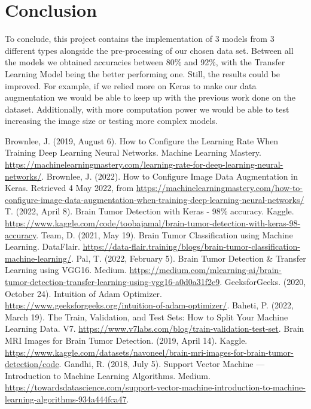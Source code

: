 \documentclass[conference]{IEEEtran}
\begin{document}
\section{Conclusion}

To conclude, this project contains the implementation of 3 models from 3 different types alongside the pre-processing of our chosen data set. Between all the models we obtained accuracies between 80\% and 92\%, with the Transfer Learning Model being the better performing one. Still, the results could be improved. For example, if we relied more on Keras to make our data augmentation we would be able to keep up with the previous work done on the dataset. Additionally, with more computation power we would be able to test increasing the image size or testing more complex models.

\begin{thebibliography}{00}
 Brownlee, J. (2019, August 6). How to Configure the Learning Rate When Training Deep Learning Neural Networks. Machine Learning Mastery. \url{https://machinelearningmastery.com/learning-rate-for-deep-learning-neural-networks/}.
 Brownlee, J. (2022). How to Configure Image Data Augmentation in Keras. Retrieved 4 May 2022, from \url{https://machinelearningmastery.com/how-to-configure-image-data-augmentation-when-training-deep-learning-neural-networks/}
 T. (2022, April 8). Brain Tumor Detection with Keras - 98\% accuracy. Kaggle. \url{https://www.kaggle.com/code/toobajamal/brain-tumor-detection-with-keras-98-accuracy}.
 Team, D. (2021, May 19). Brain Tumor Classification using Machine Learning. DataFlair. \url{https://data-flair.training/blogs/brain-tumor-classification-machine-learning/}.
 Pal, T. (2022, February 5). Brain Tumor Detection & Transfer Learning using VGG16. Medium. \url{https://medium.com/mlearning-ai/brain-tumor-detection-transfer-learning-using-vgg16-a0d0a31f2e9}.
 GeeksforGeeks. (2020, October 24). Intuition of Adam Optimizer. \url{https://www.geeksforgeeks.org/intuition-of-adam-optimizer/}.
 Baheti, P. (2022, March 19). The Train, Validation, and Test Sets: How to Split Your Machine Learning Data. V7. \url{https://www.v7labs.com/blog/train-validation-test-set}.
 Brain MRI Images for Brain Tumor Detection. (2019, April 14). Kaggle. \url{https://www.kaggle.com/datasets/navoneel/brain-mri-images-for-brain-tumor-detection/code}.
 Gandhi, R. (2018, July 5). Support Vector Machine — Introduction to Machine Learning Algorithms. Medium. \url{https://towardsdatascience.com/support-vector-machine-introduction-to-machine-learning-algorithms-934a444fca47}.

\end{thebibliography}
\end{document}
